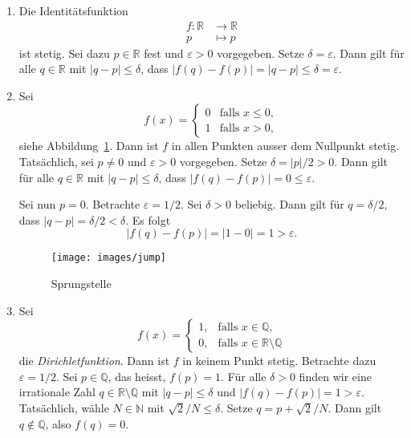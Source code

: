 \documentclass[../main.tex]{subfiles}
\begin{document}
\begin{examples}
  \leavevmode
  \begin{enumerate}[(1)]
    \item Die Identitätsfunktion
      \begin{align*}
        f \colon \mathbb{R} & \to \mathbb{R} \\
        p & \mapsto p
      \end{align*}
      ist stetig. Sei dazu $p \in \mathbb{R}$ fest
      und $\varepsilon > 0$ vorgegeben.
      Setze $\delta = \varepsilon$. Dann gilt
      für alle $q \in \mathbb{R}$ mit
      $|q - p| \leq \delta$, dass
      $|f(q) - f(p)| = |q - p| \leq \delta = \varepsilon$.
    \item Sei
      \[
        f(x) = 
        \begin{cases}
          0 & \text{falls } x \leq 0, \\
          1 & \text{falls } x > 0,
        \end{cases}
      \]
      siehe Abbildung~\ref{fig:jump}.
      Dann ist $f$ in allen Punkten ausser dem
      Nullpunkt stetig.
      Tatsächlich, sei $p \neq 0$
      und $\varepsilon > 0$ 
      vorgegeben.
      Setze $\delta = |p|/2 > 0$.
      Dann gilt für alle $q \in \mathbb{R}$ 
      mit $|q - p| \leq \delta$, dass
      $|f(q) - f(p)| = 0 \leq \varepsilon$.
      
      Sei nun $p = 0$. Betrachte $\varepsilon = 1/2$.
      Sei $\delta > 0$ beliebig.
      Dann gilt für $q = \delta/2$, dass
      $|q - p| = \delta/2 < \delta$.
      Es folgt
      \[
        |f(q) - f(p)| = |1 - 0| = 1 > \varepsilon.
      \]
      \begin{figure}[htb]
        \centering
      \texttt{[image: images/jump]}
        \caption{Sprungstelle}%
        \label{fig:jump}
      \end{figure}

    \item Sei
      \[
        f(x) = 
        \begin{cases}
          1, & \text{falls } x \in \mathbb{Q}, \\
        0,& \text{falls } x \in \mathbb{R} \setminus \mathbb{Q}
        \end{cases}
      \]
      die \emph{Dirichletfunktion}.
      Dann ist $f$ in keinem Punkt stetig.
      Betrachte dazu $\varepsilon = 1/2$.
      Sei $p \in \mathbb{Q}$, das heisst, $f(p) = 1$.
      Für alle $\delta > 0$ finden wir eine
      irrationale Zahl
      $q \in \mathbb{R} \setminus \mathbb{Q}$ mit
      $|q - p| \leq \delta$ 
      und
      $|f(q) - f(p)| = 1 > \varepsilon$.
      Tatsächlich, wähle $N \in \mathbb{N}$ 
      mit $\sqrt 2 / N \leq \delta$.
      Setze
      $q = p +\sqrt 2/N$. Dann gilt  $q \notin \mathbb{Q}$,
      also $f(q) = 0$.


\end{enumerate}
\end{examples}
\end{document}

